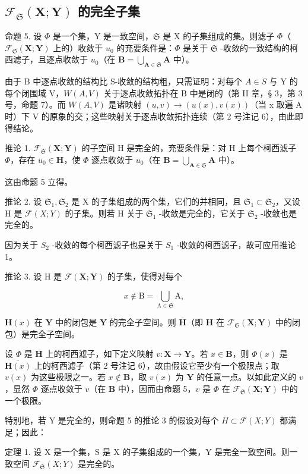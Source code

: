 \subsection{\texorpdfstring{\(\mathcal{F}_{\mathfrak{S}}(\mathbf{X};\mathbf{Y})\) 的完全子集}{F 下标 S (X;Y) 的完全子集}}

命题 5. 设 \(\Phi\) 是一个集，Y 是一致空间，\(\mathfrak{S}\) 是 X 的子集组成的集。则滤子 \(\Phi\)（\(\mathcal{F}_{\mathfrak{S}}(\mathbf{X};\mathbf{Y})\) 上的）收敛于 \(u_0\) 的充要条件是：\(\Phi\) 是关于 \(\mathfrak{S}\) -收敛的一致结构的柯西滤子，且逐点收敛于 \(u_0\)（在 \(\mathbf{B} = \bigcup_{\mathbf{A}\in \mathfrak{S}}\mathbf{A}\) 中）。

由于 B 中逐点收敛的结构比 S-收敛的结构粗，只需证明：对每个 \(A \in S\) 与 Y 的每个闭围域 V，\(W(A, V)\) 关于逐点收敛拓扑在 B 中是闭的（第 II 章，§ 3，第 3 号，命题 7）。而 \(W(A, V)\) 是诸映射 \((u, v) \to (u(x), v(x))\)（当 x 取遍 A 时）下 V 的原象的交；这些映射关于逐点收敛拓扑连续（第 2 号注记 6），由此即得结论。

推论 1. \(\mathcal{F}_{\mathfrak{S}}(\mathbf{X};\mathbf{Y})\) 的子空间 H 是完全的，充要条件是：对 H 上每个柯西滤子 \(\Phi\)，存在 \(u_0\in \mathbf{H}\)，使 \(\Phi\) 逐点收敛于 \(u_0\)（在 \(\mathbf{B} = \bigcup_{\mathbf{A}\in \mathfrak{S}}\mathbf{A}\) 中）。

这由命题 5 立得。

推论 2. 设 \(\mathfrak{S}_1, \mathfrak{S}_2\) 是 X 的子集组成的两个集，它们的并相同，且 \(\mathfrak{S}_1 \subset \mathfrak{S}_2\)，又设 H 是 \(\mathcal{F}(X; Y)\) 的子集。则若 H 关于 \(\mathfrak{S}_1\) -收敛是完全的，它关于 \(\mathfrak{S}_2\) -收敛也是完全的。

因为关于 \(S_{2}\) -收敛的每个柯西滤子也是关于 \(S_{1}\) -收敛的柯西滤子，故可应用推论 1。

推论 3. 设 H 是 \(\mathcal{F}(\mathbf{X};\mathbf{Y})\) 的子集，使得对每个

\[
x \notin \mathrm{B} = \bigcup_ {\mathrm{A} \in \mathfrak {S}} \mathrm{A},
\]

\(\mathbf{H}(x)\) 在 \(\mathbf{Y}\) 中的闭包是 \(\mathbf{Y}\) 的完全子空间。则 \(\overline{\mathbf{H}}\)（即 \(\mathbf{H}\) 在 \(\mathcal{F}_{\mathfrak{S}}(\mathbf{X};\mathbf{Y})\) 中的闭包）是完全子空间。

设 \(\Phi\) 是 \(\overline{\mathbf{H}}\) 上的柯西滤子，如下定义映射 \(v: \mathbf{X} \to \mathbf{Y}\)。若 \(x \in \mathbf{B}\)，则 \(\Phi(x)\) 是 \(\overline{\mathbf{H}(x)}\) 上的柯西滤子（第 2 号注记 6），故由假设它至少有一个极限点；取 \(v(x)\) 为这些极限之一。若 \(x \notin \mathbf{B}\)，取 \(v(x)\) 为 \(\mathbf{Y}\) 的任意一点。以如此定义的 \(v\)，显然 \(\Phi\) 逐点收敛于 \(v\)（在 \(\mathbf{B}\) 中），因而由命题 5，\(v\) 是 \(\Phi\) 在 \(\mathcal{F}_{\mathfrak{S}}(\mathbf{X}; \mathbf{Y})\) 中的一个极限。

特别地，若 Y 是完全的，则命题 5 的推论 3 的假设对每个 \(H \subset \mathcal{F}(X; Y)\) 都满足；因此：

定理 1. 设 X 是一个集，S 是 X 的子集组成的一个集，Y 是完全一致空间。则一致空间 \(\mathcal{F}_{\mathfrak{S}}(X;Y)\) 是完全的。
\relax{}
